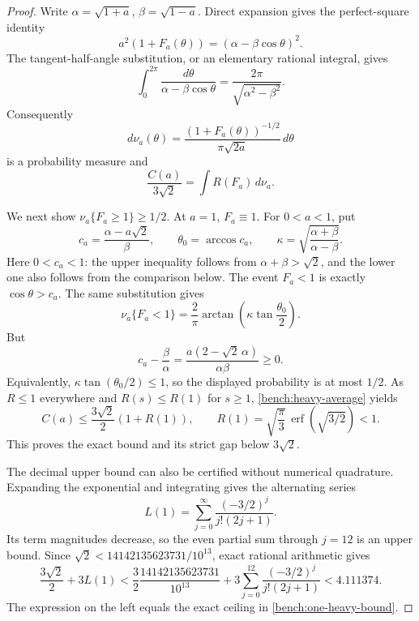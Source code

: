 \begin{proof}
Write \(\alpha=\sqrt{1+a}\), \(\beta=\sqrt{1-a}\).
Direct expansion gives the perfect-square identity
\[
 a^2(1+F_a(\theta))=(\alpha-\beta\cos\theta)^2.
\]
The tangent-half-angle substitution, or an elementary rational
integral, gives
\[
 \int_0^{2\pi}\frac{d\theta}{\alpha-\beta\cos\theta}
       =\frac{2\pi}{\sqrt{\alpha^2-\beta^2}}.
\]
Consequently
\[
 d\nu_a(\theta)=
 \frac{(1+F_a(\theta))^{-1/2}}{\pi\sqrt{2a}}\,d\theta
\]
is a probability measure and
\begin{equation}\label{bench:heavy-average}
 \frac{C(a)}{3\sqrt2}=\int R(F_a)\,d\nu_a.
\end{equation}

We next show \(\nu_a\{F_a\geq1\}\geq1/2\).
At \(a=1\), \(F_a\equiv1\).  For \(0<a<1\), put
\[
 c_a=\frac{\alpha-a\sqrt2}{\beta},\qquad
 \theta_0=\arccos c_a,\qquad
 \kappa=\sqrt{\frac{\alpha+\beta}{\alpha-\beta}}.
\]
Here \(0<c_a<1\): the upper inequality follows from
\(\alpha+\beta>\sqrt2\), and the lower one also follows from
the comparison below.  The event \(F_a<1\) is exactly
\(\cos\theta>c_a\).  The same substitution gives
\[
 \nu_a\{F_a<1\}
 =\frac2\pi\arctan\left(\kappa\tan\frac{\theta_0}{2}\right).
\]
But
\[
 c_a-\frac\beta\alpha
 =\frac{a(2-\sqrt2\,\alpha)}{\alpha\beta}\geq0.
\]
Equivalently,
\(\kappa\tan(\theta_0/2)\leq1\), so the displayed probability
is at most \(1/2\).  As \(R\leq1\) everywhere and
\(R(s)\leq R(1)\) for \(s\geq1\),
\eqref{bench:heavy-average} yields
\[
 C(a)\leq\frac{3\sqrt2}{2}(1+R(1)),\qquad
 R(1)=\sqrt{\frac\pi3}\,
              \operatorname{erf}(\sqrt{3/2})<1.
\]
This proves the exact bound and its strict gap below \(3\sqrt2\).

The decimal upper bound can also be certified without numerical
quadrature.  Expanding the exponential and integrating gives the
alternating series
\[
 L(1)=\sum_{j=0}^{\infty}
       \frac{(-3/2)^j}{j!(2j+1)}.
\]
Its term magnitudes decrease, so the even partial sum through
\(j=12\) is an upper bound.  Since
\(\sqrt2<14142135623731/10^{13}\), exact rational arithmetic gives
\[
 \frac{3\sqrt2}{2}+3L(1)
 <\frac{3}{2}\frac{14142135623731}{10^{13}}
       +3\sum_{j=0}^{12}\frac{(-3/2)^j}{j!(2j+1)}
 <4.111374.
\]
The expression on the left equals the exact ceiling in
\eqref{bench:one-heavy-bound}.
\end{proof}

